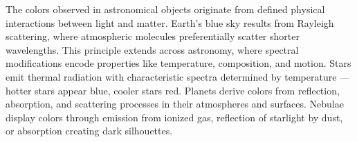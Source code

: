 The colors observed in astronomical objects originate from defined physical interactions between light and matter. Earth's blue sky results from Rayleigh scattering, where atmospheric molecules preferentially scatter shorter wavelengths. This principle extends across astronomy, where spectral modifications encode properties like temperature, composition, and motion. Stars emit thermal radiation with characteristic spectra determined by temperature — hotter stars appear blue, cooler stars red. Planets derive colors from reflection, absorption, and scattering processes in their atmospheres and surfaces. Nebulae display colors through emission from ionized gas, reflection of starlight by dust, or absorption creating dark silhouettes.